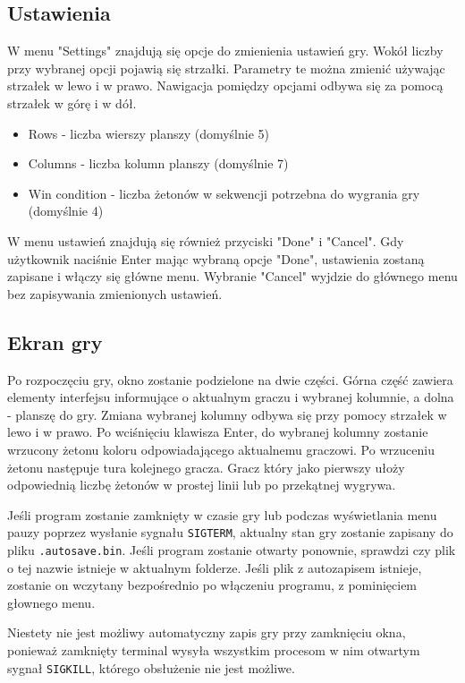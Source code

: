 \documentclass{article}
\begin{document}
\subsection*{Ustawienia}
W menu "Settings" znajdują się opcje do zmienienia ustawień gry. Wokół liczby przy wybranej opcji pojawią się strzałki. 
Parametry te można zmienić używając strzałek w lewo i w prawo. Nawigacja pomiędzy opcjami odbywa się za pomocą strzałek
w górę i w dół.
\begin{itemize}
    \item Rows - liczba wierszy planszy (domyślnie 5)
    \item Columns - liczba kolumn planszy (domyślnie 7)
    \item Win condition - liczba żetonów w sekwencji potrzebna do wygrania gry (domyślnie 4)
\end{itemize}
W menu ustawień znajdują się również przyciski "Done" i "Cancel". Gdy użytkownik naciśnie Enter mając
wybraną opcje "Done", ustawienia zostaną zapisane i włączy się główne menu. Wybranie "Cancel" wyjdzie do głównego menu
bez zapisywania zmienionych ustawień.

\subsection*{Ekran gry}

Po rozpoczęciu gry, okno zostanie podzielone na dwie części. Górna część zawiera elementy
interfejsu informujące o aktualnym graczu i wybranej kolumnie, a dolna - planszę do gry.
Zmiana wybranej kolumny odbywa się przy pomocy strzałek w lewo i w prawo. Po wciśnięciu klawisza Enter, do wybranej
kolumny zostanie wrzucony żetonu koloru odpowiadającego aktualnemu graczowi. Po wrzuceniu żetonu następuje tura
kolejnego gracza. Gracz który jako pierwszy ułoży odpowiednią liczbę żetonów w prostej linii lub po przekątnej wygrywa.

Jeśli program zostanie zamknięty w czasie gry lub podczas wyświetlania menu pauzy poprzez wysłanie sygnału 
\texttt{SIGTERM}, aktualny stan gry zostanie zapisany do pliku \texttt{.autosave.bin}. 
Jeśli program zostanie otwarty ponownie, sprawdzi czy plik o tej nazwie istnieje
w aktualnym folderze. Jeśli plik z autozapisem istnieje, zostanie on wczytany bezpośrednio po włączeniu programu,
z pominięciem głownego menu.

Niestety nie jest możliwy automatyczny zapis gry przy zamknięciu okna, ponieważ zamknięty terminal wysyła wszystkim
procesom w nim otwartym sygnał \texttt{SIGKILL}, którego obsłużenie nie jest możliwe.
\end{document}
